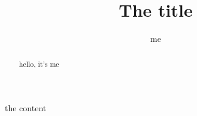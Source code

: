 
\title{The title}
\author{me}


\begin{abstract}
hello, it's me
\end{abstract}
\maketitle

the content


